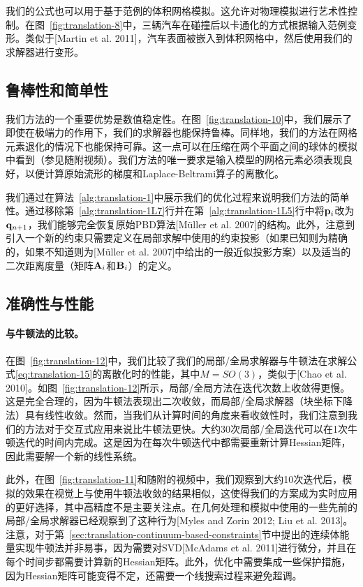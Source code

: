 \begin{translation}
我们的公式也可以用于基于范例的体积网格模拟。这允许对物理模拟进行艺术性控制。在图~\ref{fig:translation-8}中，三辆汽车在碰撞后以卡通化的方式根据输入范例变形。类似于[Martin et al. 2011]，汽车表面被嵌入到体积网格中，然后使用我们的求解器进行变形。

\subsection{鲁棒性和简单性}

我们方法的一个重要优势是数值稳定性。在图~\ref{fig:translation-10}中，我们展示了即使在极端力的作用下，我们的求解器也能保持鲁棒。同样地，我们的方法在网格元素退化的情况下也能保持可靠。这一点可以在压缩在两个平面之间的球体的模拟中看到（参见随附视频）。我们方法的唯一要求是输入模型的网格元素必须表现良好，以便计算原始流形的梯度和Laplace-Beltrami算子的离散化。

我们通过在算法~\ref{alg:translation-1}中展示我们的优化过程来说明我们方法的简单性。通过移除第~\ref{alg:translation-1L7}行并在第~\ref{alg:translation-1L5}行中将$\vb{p}_i$改为$\vb{q}_{n + 1}$，我们能够完全恢复原始PBD算法[Müller et al. 2007]的结构。此外，注意到引入一个新的约束只需要定义在局部求解中使用的约束投影（如果已知则为精确的，如果不知道则为[Müller et al. 2007]中给出的一般近似投影方案）以及适当的二次距离度量（矩阵$\vb{A}_i$和$\vb{B}_i$）的定义。

\subsection{准确性与性能}

\paragraph{与牛顿法的比较。}

在图~\ref{fig:translation-12}中，我们比较了我们的局部/全局求解器与牛顿法在求解公式\eqref{eq:translation-15}的离散化时的性能，其中$M = SO(3)$，类似于[Chao et al. 2010]。如图~\ref{fig:translation-12}所示，局部/全局方法在迭代次数上收敛得更慢。这是完全合理的，因为牛顿法表现出二次收敛，而局部/全局求解器（块坐标下降法）具有线性收敛。然而，当我们从计算时间的角度来看收敛性时，我们注意到我们的方法对于交互式应用来说比牛顿法更快。大约30次局部/全局迭代可以在1次牛顿迭代的时间内完成。这是因为在每次牛顿迭代中都需要重新计算Hessian矩阵，因此需要解一个新的线性系统。

此外，在图~\ref{fig:translation-11}和随附的视频中，我们观察到大约10次迭代后，模拟的效果在视觉上与使用牛顿法收敛的结果相似，这使得我们的方案成为实时应用的更好选择，其中高精度不是主要关注点。在几何处理和模拟中使用的一些先前的局部/全局求解器已经观察到了这种行为[Myles and Zorin 2012; Liu et al. 2013]。注意，对于第~\ref{sec:translation-continuum-based-constraints}节中提出的连续体能量实现牛顿法并非易事，因为需要对SVD[McAdams et al. 2011]进行微分，并且在每个时间步都需要计算新的Hessian矩阵。此外，优化中需要集成一些保护措施，因为Hessian矩阵可能变得不定，还需要一个线搜索过程来避免超调。


\end{translation}
